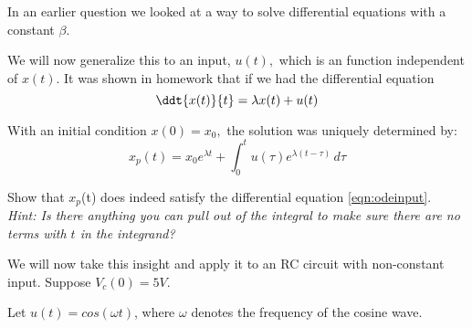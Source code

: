 
In an earlier question we looked at a way to solve differential equations with a constant $\beta.$
\par

We will now generalize this to an input, $u(t),$ which is an function independent of $x(t)$.
It was shown in homework that if we had the differential equation
\begin{equation} \label{eqn:odeinput}
  \ddt{x(t)}{t} = \lambda x(t) + u(t)
\end{equation}

With an initial condition $x(0) = x_0,$ the solution was uniquely determined by:
\begin{equation} \label{eqn:odesol}
    x_{p}(t) = x_{0}e^{\lambda{}t} + \int_0^t \! u(\tau{})e^{\lambda{}(t - \tau{})} \, d\tau{}
\end{equation}

\begin{enumerate}

\qitem Show that $x_{p}$(t) does indeed satisfy the differential equation \eqref{eqn:odeinput}. \\
\textit{Hint: Is there anything you can pull out of the integral to make sure there are no terms with $t$ in the integrand?}


\end{enumerate}

We will now take this insight and apply it to an RC circuit with non-constant input. Suppose $V_{c}(0) = 5V$.

\begin{figure}[H]
 
\end{figure}
Let $u(t) = cos(\omega{}t)$, where $\omega{}$ denotes the frequency of the cosine wave.

